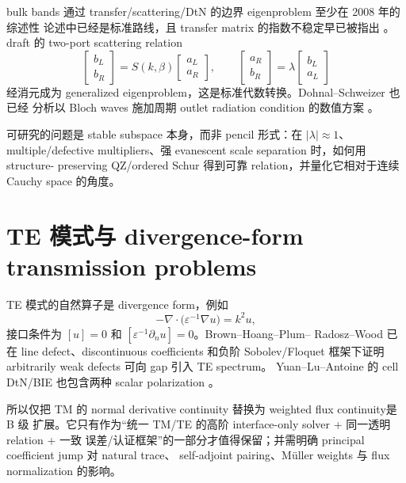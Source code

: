 \documentclass[UTF8,11pt,fontset=none]{ctexart}
\begin{document}
bulk bands 通过 transfer/scattering/DtN 的边界 eigenproblem 至少在 2008 年的综述性
论述中已经是标准路线，且 transfer matrix 的指数不稳定早已被指出
\cite{YuanLuAntoine2008}。draft 的 two-port scattering relation
\begin{equation}
  \begin{bmatrix}b_L\\ b_R\end{bmatrix}
  =S(k,\beta)\begin{bmatrix}a_L\\a_R\end{bmatrix},
  \qquad
  \begin{bmatrix}a_R\\b_R\end{bmatrix}
  =\lambda\begin{bmatrix}b_L\\a_L\end{bmatrix}
\end{equation}
经消元成为 generalized eigenproblem，这是标准代数转换。Dohnal--Schweizer 也已经
分析以 Bloch waves 施加周期 outlet radiation condition 的数值方案
\cite{DohnalSchweizer2018}。

可研究的问题是 stable subspace 本身，而非 pencil 形式：在 \(|\lambda|\approx1\)、
multiple/defective multipliers、强 evanescent scale separation 时，如何用 structure-
preserving QZ/ordered Schur 得到可靠 relation，并量化它相对于连续 Cauchy space 的角度。

\section{TE 模式与 divergence-form transmission problems}

TE 模式的自然算子是 divergence form，例如
\begin{equation}
  -\nabla\!\cdot\!\bigl(\varepsilon^{-1}\nabla u\bigr)=k^2u,
\end{equation}
接口条件为 \([u]=0\) 和 \([\varepsilon^{-1}\partial_nu]=0\)。Brown--Hoang--Plum--
Radosz--Wood 已在 line defect、discontinuous coefficients 和负阶 Sobolev/Floquet
框架下证明 arbitrarily weak defects 可向 gap 引入 TE spectrum\cite{BrownEtAl2017}。
Yuan--Lu--Antoine 的 cell DtN/BIE 也包含两种 scalar polarization
\cite{YuanLuAntoine2008}。

所以仅把 TM 的 normal derivative continuity 替换为 weighted flux continuity是 B 级
扩展。它只有作为“统一 TM/TE 的高阶 interface-only solver + 同一透明 relation + 一致
误差/认证框架”的一部分才值得保留；并需明确 principal coefficient jump 对 natural trace、
self-adjoint pairing、Müller weights 与 flux normalization 的影响。
\end{document}
